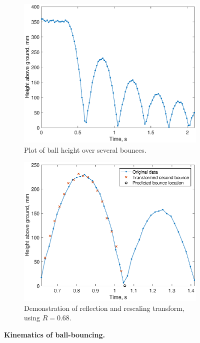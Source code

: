 \documentclass[letterpaper, 11pt]{article}
\begin{document}
\begin{figure}[ht]
    \centering
    \begin{subfigure}[t]{0.48\textwidth}
        \includegraphics[width=\textwidth]{images/fig_bounce.eps}
        \caption{Plot of ball height over several bounces.}
        \label{fig:bounce}
    \end{subfigure}%
    \begin{subfigure}[t]{0.48\textwidth}
        \includegraphics[width=\textwidth]{images/fig_transform.eps}
        \caption{Demonstration of reflection and rescaling transform, using $R = 0.68$.}
        \label{fig:transform}
    \end{subfigure}
    \caption{\textbf{Kinematics of ball-bouncing.}}
\end{figure}
\end{document}
